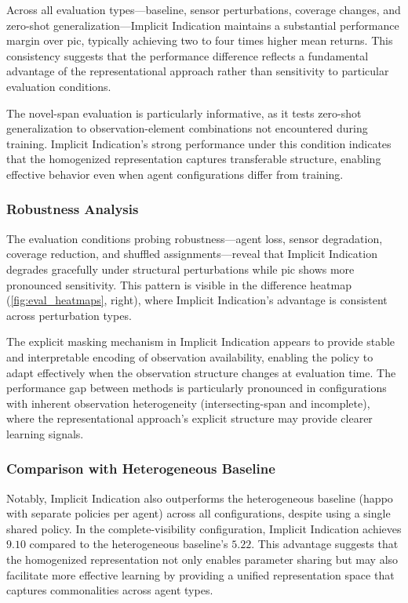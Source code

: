 Across all evaluation types—baseline, sensor perturbations, coverage changes, 
and zero-shot generalization—Implicit Indication maintains a substantial 
performance margin over \gls{pic}, typically achieving two to four times 
higher mean returns. This consistency suggests that the performance 
difference reflects a fundamental advantage of the representational 
approach rather than sensitivity to particular evaluation conditions.

The novel-span evaluation is particularly informative, as it tests 
zero-shot generalization to observation-element combinations not 
encountered during training. Implicit Indication's strong performance 
under this condition indicates that the homogenized representation 
captures transferable structure, enabling effective behavior even 
when agent configurations differ from training.

\subsubsection{Robustness Analysis}

The evaluation conditions probing robustness—agent loss, sensor degradation, 
coverage reduction, and shuffled assignments—reveal that Implicit Indication 
degrades gracefully under structural perturbations while \gls{pic} shows 
more pronounced sensitivity. This pattern is visible in the difference 
heatmap (\cref{fig:eval_heatmaps}, right), where Implicit Indication's 
advantage is consistent across perturbation types.

The explicit masking mechanism in Implicit Indication appears to provide 
stable and interpretable encoding of observation availability, enabling 
the policy to adapt effectively when the observation structure changes 
at evaluation time. The performance gap between methods is particularly 
pronounced in configurations with inherent observation heterogeneity 
(intersecting-span and incomplete), where the representational approach's 
explicit structure may provide clearer learning signals.

\subsubsection{Comparison with Heterogeneous Baseline}

Notably, Implicit Indication also outperforms the heterogeneous baseline 
(\gls{happo} with separate policies per agent) across all configurations, 
despite using a single shared policy. In the complete-visibility configuration, 
Implicit Indication achieves $9.10$ compared to the heterogeneous baseline's $5.22$. 
This advantage suggests that the homogenized representation not only enables parameter 
sharing but may also facilitate more effective learning by providing a unified 
representation space that captures commonalities across agent types.

